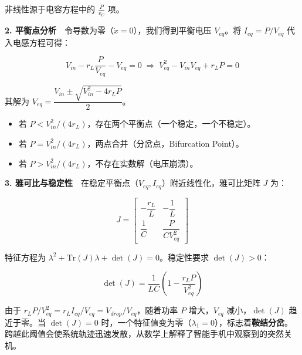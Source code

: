 \documentclass[11pt,a4paper]{ctexart}
\begin{document}
非线性源于电容方程中的 $\frac{P}{v_C}$ 项。

\noindent\textbf{2. 平衡点分析}　令导数为零（$\dot{x} = 0$），我们得到平衡电压 $V_{eq}$。将 $I_{eq} = P/V_{eq}$ 代入电感方程可得：

\begin{equation*}
V_{in} - r_L\frac{P}{V_{eq}} - V_{eq} = 0 \;\Longrightarrow\; V_{eq}^2 - V_{in}V_{eq} + r_L P = 0
\end{equation*}

其解为 $V_{eq} = \dfrac{V_{in} \pm \sqrt{V_{in}^2 - 4r_L P}}{2}$。

\begin{itemize}[leftmargin=1.6em,itemsep=0.3em]
\item 若 $P < V_{in}^2/(4r_L)$，存在两个平衡点（一个稳定，一个不稳定）。
\item 若 $P = V_{in}^2/(4r_L)$，两点合并（分岔点，Bifurcation Point）。
\item 若 $P > V_{in}^2/(4r_L)$，不存在实数解（电压崩溃）。
\end{itemize}

\noindent\textbf{3. 雅可比与稳定性}　在稳定平衡点（$V_{eq}, I_{eq}$）附近线性化，雅可比矩阵 $J$ 为：

\begin{equation*}
J =
\begin{bmatrix}
-\dfrac{r_L}{L} & -\dfrac{1}{L} \\[8pt]
\dfrac{1}{C} & \dfrac{P}{C V_{eq}^2}
\end{bmatrix}
\end{equation*}

特征方程为 $\lambda^2 + \mathrm{Tr}(J)\lambda + \det(J) = 0$。稳定性要求 $\det(J) > 0$：

\begin{equation*}
\det(J) = \frac{1}{LC}\left(1 - \frac{r_L P}{V_{eq}^2}\right)
\end{equation*}

由于 $r_L P/V_{eq}^2 = r_L I_{eq}/V_{eq} = V_{drop}/V_{eq}$，随着功率 $P$ 增大，$V_{eq}$ 减小，$\det(J)$ 趋近于零。当 $\det(J) = 0$ 时，一个特征值变为零（$\lambda_1 = 0$），标志着\textbf{鞍结分岔}。跨越此阈值会使系统轨迹迅速发散，从数学上解释了智能手机中观察到的突然关机。
\end{document}
